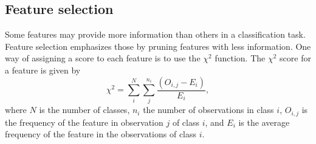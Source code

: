 \subsection{Feature selection}
Some features may provide more information than others in a classification task. Feature selection emphasizes those by pruning features with less information. One way of assigning a score to each feature is to use the $\chi^2$ function. The $\chi^2$ score for a feature is given by
\[
\chi^2 = \sum_i^N \sum_j^{n_i} \frac{\left ( O_{i,j} - E_i \right )}{E_i},
\]
where $N$ is the number of classes, $n_i$ the number of observations in class $i$, $O_{i,j}$ is the frequency of the feature in observation $j$ of class $i$, and $E_i$ is the average frequency of the feature in the observations of class $i$. 